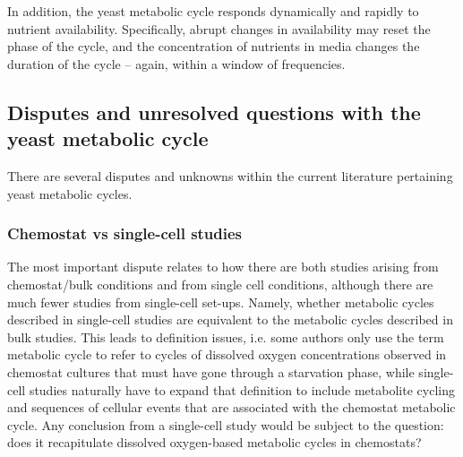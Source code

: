 In addition, the yeast metabolic cycle responds dynamically and rapidly to nutrient availability.
Specifically, abrupt changes in availability may reset the phase of the cycle, and the concentration of nutrients in media changes the duration of the cycle -- again, within a window of frequencies.


\subsection{Disputes and unresolved questions with the yeast metabolic cycle}
\label{subsec:intro-ymc-unresolved}

There are several disputes and unknowns within the current literature pertaining yeast metabolic cycles.

\subsubsection{Chemostat vs single-cell studies}
\label{subsubsec:intro-ymc-unresolved-chemostat_singlecell}

The most important dispute relates to how there are both studies arising from chemostat/bulk conditions and from single cell conditions,
although there are much fewer studies from single-cell set-ups.
Namely, whether metabolic cycles described in single-cell studies are equivalent to the metabolic cycles described in bulk studies.
This leads to definition issues, i.e. some authors only use the term metabolic cycle to refer to cycles of dissolved oxygen concentrations observed in chemostat cultures that must have gone through a starvation phase, while single-cell studies naturally have to expand that definition to include metabolite cycling and sequences of cellular events that are associated with the chemostat metabolic cycle.
Any conclusion from a single-cell study would be subject to the question: does it recapitulate dissolved oxygen-based metabolic cycles in chemostats?

